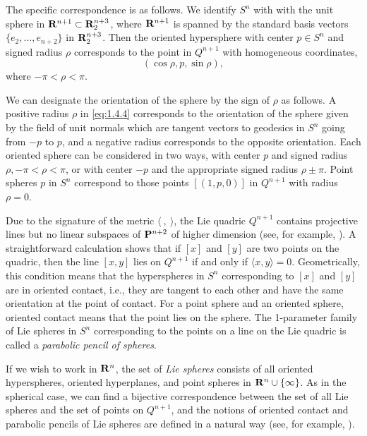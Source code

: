 \documentclass[12pt]{article}
\begin{document}
The specific correspondence is as follows.  We identify $S^n$ with
with the unit sphere in ${\bf R}^{n+1} \subset {\bf R}^{n+3}_2$, where ${\bf R}^{n+1}$ is spanned by the 
standard basis vectors $\{e_2,\ldots,e_{n+2}\}$ in ${\bf R}^{n+3}_2$.
Then the oriented hypersphere with center $p \in S^n$ and
signed radius $\rho$ corresponds to the point in $Q^{n+1}$ with homogeneous coordinates,
\begin{equation}
\label{eq:1.4.4}
(\cos \rho , p, \sin \rho ),
\end{equation}
where $ - \pi < \rho < \pi$.

We can designate the orientation of the sphere by the sign of
$\rho$ as follows.  A positive radius $\rho$ in 
\eqref{eq:1.4.4} corresponds to the orientation of the sphere given by 
the field of unit normals which are tangent vectors to geodesics in $S^n$ 
going from $-p$ to $p$, and a negative radius corresponds
to the opposite orientation.
Each oriented sphere can be considered in two ways, with center $p$ and signed radius $\rho, - \pi < \rho < \pi$,
or with center $-p$ and the appropriate signed radius $\rho \pm \pi$.
Point spheres $p$ in $S^n$ correspond to those points $[(1, p, 0)]$ in $Q^{n+1}$ with radius $\rho = 0$.

Due to the signature of the metric $\langle \ ,\ \rangle$, the
Lie quadric $Q^{n+1}$ contains projective lines but no linear
subspaces of ${\bf P}^{n+2}$ of higher dimension (see, for example, \cite[p. 21]{Cec1}).  
A straightforward calculation
shows that if $[x]$ and $[y]$ are two points on the quadric, 
then the line $[x,y]$ 
lies on $Q^{n+1}$ if and only if $\langle x,y \rangle=0$.  Geometrically,
this condition means that the hyperspheres in $S^n$ corresponding
to $[x]$ and $[y]$ are in oriented contact, i.e., they are tangent to each other
and have the same orientation at the point of contact.
For a point sphere and an oriented sphere, oriented contact means that the point lies on the sphere.
The 1-parameter family
of Lie spheres  in $S^n$ corresponding to the points on a line on the Lie quadric is called a 
{\em parabolic pencil of spheres}.


If we wish to work in ${\bf R}^n$, the set of {\em Lie spheres} consists of all oriented hyperspheres, oriented hyperplanes, and point spheres in ${\bf R}^n \cup \{ \infty\}$.  As in the spherical case,
we can find a bijective correspondence between the set of all Lie spheres and the set of
points on $Q^{n+1}$, and the notions of oriented contact and parabolic pencils of
Lie spheres are defined in a natural way (see, 
for example, \cite[pp. 14--23]{Cec1}).
\end{document}
